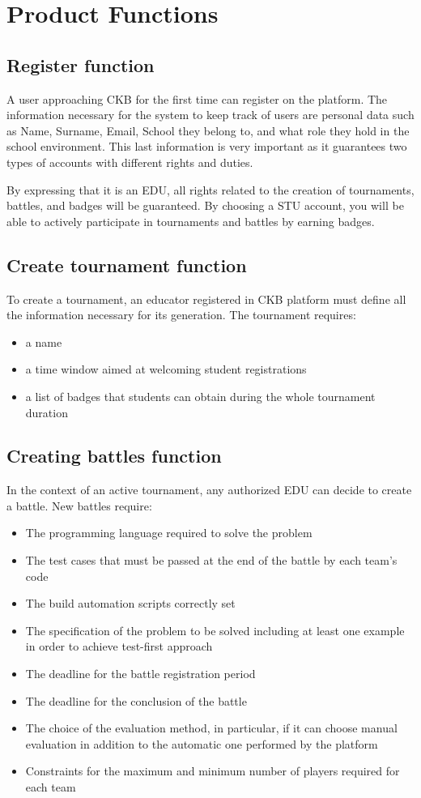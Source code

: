 \section{Product Functions}
\subsection{Register function}
A user approaching CKB for the first time can register on the platform.
The information necessary for the system to keep track of users are personal data such as Name, Surname, Email, School they belong to, and what role they hold in the school environment.
This last information is very important as it guarantees two types of accounts with different rights and duties.

By expressing that it is an EDU, all rights related to the creation of tournaments, battles, and badges will be guaranteed.
By choosing a STU account, you will be able to actively participate in tournaments and battles by earning badges.

\subsection{Create tournament function}
To create a tournament, an educator registered in CKB platform must define all the information necessary for its generation.
The tournament requires:
\begin{itemize}
    \item a name
    \item a time window aimed at welcoming student registrations
    \item a list of badges that students can obtain during the whole tournament duration
\end{itemize}

\subsection{Creating battles function}
In the context of an active tournament, any authorized EDU can decide to create a battle.
New battles require:
\begin{itemize}
    \item The programming language required to solve the problem
    \item The test cases that must be passed at the end of the battle by each team's code
    \item The build automation scripts correctly set
    \item The specification of the problem to be solved including at least one example in order to achieve test-first approach
    \item The deadline for the battle registration period
    \item The deadline for the conclusion of the battle
    \item The choice of the evaluation method, in particular, if it can choose manual evaluation in addition to the automatic one performed by the platform
    \item Constraints for the maximum and minimum number of players required for each team
\end{itemize}

